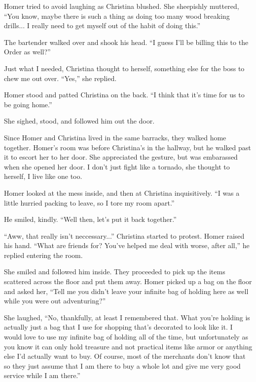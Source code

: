 \documentclass[showtrims,b6paper,draft,10pt]{memoir}
\begin{document}
Homer tried to avoid laughing as Christina blushed.  She sheepishly muttered, ``You know, maybe there is such a thing as doing too many wood breaking drills...  I really need to get myself out of the habit of doing this.''

The bartender walked over and shook his head.  ``I guess I'll be billing this to the Order as well?''

Just what I needed, Christina thought to herself, something else for the boss to chew me out over.  ``Yes,'' she replied.

Homer stood and patted Christina on the back.  ``I think that it's time for us to be going home.''

She sighed, stood, and followed him out the door. 

\timeskip
Since Homer and Christina lived in the same barracks, they walked home together.  Homer's room was before Christina's in the hallway, but he walked past it to escort her to her door.  She appreciated the gesture, but was embarassed when she opened her door.  I don't just fight like a tornado, she thought to herself, I live like one too.

Homer looked at the mess inside, and then at Christina inquisitively.  ``I was a little hurried packing to leave, so I tore my room apart.''

He smiled, kindly. ``Well then, let's put it back together.''

``Aww, that really isn't neccessary...'' Christina started to protest.  Homer raised his hand.  ``What are friends for?  You've helped me deal with worse, after all,'' he replied entering the room.

She smiled and followed him inside.  They proceeded to pick up the items scattered across the floor and put them away.  Homer picked up a bag on the floor and asked her,  ``Tell me you didn't leave your infinite bag of holding here as well while you were out adventuring?''

She laughed, ``No, thankfully, at least I remembered that.  What you're holding is actually just a bag that I use for shopping that's decorated to look like it.  I would love to use my infinite bag of holding all of the time, but unfortunately as you know it can only hold treasure and not practical items like armor or anything else I'd actually want to buy.  Of course, most of the merchants don't know that so they just assume that I am there to buy a whole lot and give me very good service while I am there.''
\end{document}
